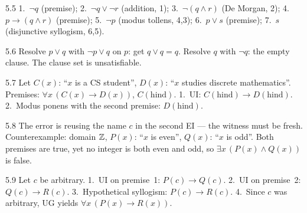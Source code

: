 \begin{solution}{5.5}
1.~$\neg q$ (premise); 2.~$\neg q \vee \neg r$ (addition, 1);
3.~$\neg(q \wedge r)$ (De Morgan, 2); 4.~$p \to (q \wedge r)$ (premise);
5.~$\neg p$ (modus tollens, 4,3); 6.~$p \vee s$ (premise); 7.~$s$
(disjunctive syllogism, 6,5).
\end{solution}

\begin{solution}{5.6}
Resolve $p \vee q$ with $\neg p \vee q$ on $p$: get $q \vee q = q$. Resolve
$q$ with $\neg q$: the empty clause. The clause set is unsatisfiable.
\end{solution}

\begin{solution}{5.7}
Let $C(x)$: ``$x$ is a CS student'', $D(x)$: ``$x$ studies discrete
mathematics''. Premises: $\forall x\,(C(x) \to D(x))$, $C(\mathrm{hind})$.
1.~UI: $C(\mathrm{hind}) \to D(\mathrm{hind})$. 2.~Modus ponens with the
second premise: $D(\mathrm{hind})$.
\end{solution}

\begin{solution}{5.8}
The error is reusing the name $c$ in the second EI --- the witness must be
fresh. Counterexample: domain $\mathbb{Z}$, $P(x)$: ``$x$ is even'', $Q(x)$: ``$x$
is odd''. Both premises are true, yet no integer is both even and odd, so
$\exists x\,(P(x) \wedge Q(x))$ is false.
\end{solution}

\begin{solution}{5.9}
Let $c$ be arbitrary. 1.~UI on premise~1: $P(c) \to Q(c)$. 2.~UI on
premise~2: $Q(c) \to R(c)$. 3.~Hypothetical syllogism: $P(c) \to R(c)$.
4.~Since $c$ was arbitrary, UG yields $\forall x\,(P(x) \to R(x))$.
\end{solution}
